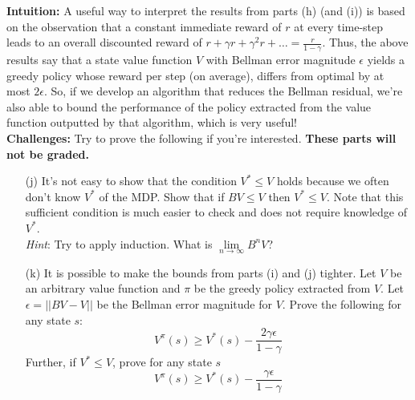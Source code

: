 \noindent \textbf{Intuition:} A useful way to interpret the results from parts (h) (and (i)) is based on the observation that a constant immediate reward of $r$ at every time-step leads to an overall discounted reward of $r + \gamma r + \gamma^2 r + \ldots = \frac{r}{1-\gamma}$. Thus, the above results say that a state value function $V$ with Bellman error magnitude $\epsilon$ yields a greedy policy whose reward per step (on average), differs from optimal by at most $2\epsilon$. So, if we develop an algorithm that reduces the Bellman residual, we're also able to bound the performance of the policy extracted from the value function outputted by that algorithm, which is very useful!
\\

\noindent \textbf{Challenges:} Try to prove the following if you're interested. \textbf{These parts will not be graded.}

\begin{enumerate}
    \item[(j)] It's not easy to show that the condition $V^* \leq V$ holds because we often don't know $V^*$ of the MDP. Show that if $BV \leq V$ then $V^* \leq V$. Note that this sufficient condition is much easier to check and does not require knowledge of $V^*$. \\
    \textit{Hint}: Try to apply induction. What is $\lim\limits_{n \rightarrow \infty} B^n V$?

\item[(k)] It is possible to make the bounds from parts (i) and (j) tighter. 
Let $V$ be an arbitrary value function and $\pi$ be the greedy policy extracted from $V$. Let $\epsilon = ||BV-V||$ be the Bellman error magnitude for $V$. Prove the following for any state $s$:
\begin{equation}
        V^\pi(s) \geq V^*(s) - \frac{2\gamma\epsilon}{1-\gamma}
\end{equation}
Further, if $V^* \leq V$, prove for any state $s$
\begin{equation}
        V^\pi(s) \geq V^*(s) - \frac{\gamma\epsilon}{1-\gamma}
\end{equation}
\end{enumerate}






\noindent 